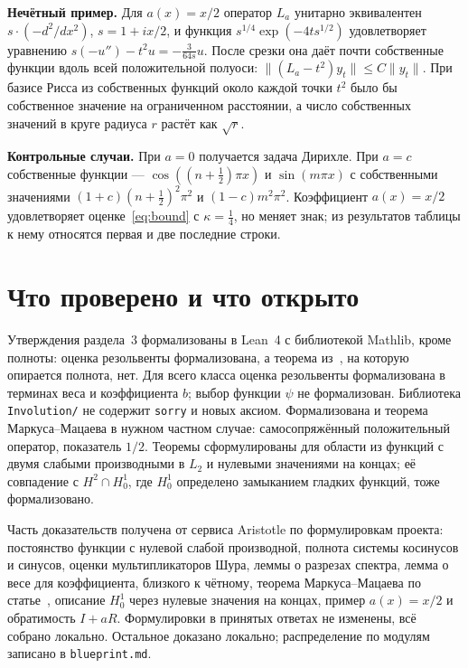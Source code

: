 \documentclass[12pt,a4paper]{article}
\begin{document}
\textbf{Нечётный пример.} Для $a(x)=x/2$ оператор $L_a$ унитарно эквивалентен
$s\cdot(-d^2/dx^2)$, $s=1+ix/2$, и функция $s^{1/4}\exp(-4ts^{1/2})$ удовлетворяет
уравнению $s(-u'')-t^2u=-\tfrac3{64s}u$. После срезки она даёт почти собственные функции
вдоль всей положительной полуоси: $\|(L_a-t^2)y_t\|\le C\|y_t\|$. При базисе Рисса из
собственных функций около каждой точки $t^2$ было бы собственное значение на ограниченном
расстоянии, а число собственных значений в круге радиуса $r$ растёт как $\sqrt r$.

\textbf{Контрольные случаи.} При $a=0$ получается задача Дирихле. При $a=c$ собственные
функции --- $\cos((n+\tfrac12)\pi x)$ и $\sin(m\pi x)$ с собственными значениями
$(1+c)(n+\tfrac12)^2\pi^2$ и $(1-c)m^2\pi^2$. Коэффициент $a(x)=x/2$ удовлетворяет
оценке~\eqref{eq:bound} с $\kappa=\tfrac14$, но меняет знак; из результатов таблицы к
нему относятся первая и две последние строки.

\section{Что проверено и что открыто}
Утверждения раздела~3 формализованы в Lean~4 с библиотекой Mathlib, кроме полноты:
оценка резольвенты формализована, а теорема из~\cite{S3}, на которую опирается полнота,
нет. Для всего класса оценка резольвенты формализована в терминах веса и коэффициента
$b$; выбор функции $\psi$ не формализован. Библиотека
\texttt{Involution/} не содержит \texttt{sorry} и новых аксиом. Формализована и теорема
Маркуса--Мацаева в нужном частном случае: самосопряжённый положительный оператор,
показатель $1/2$. Теоремы сформулированы для области из функций с двумя слабыми
производными в $L_2$ и нулевыми значениями на концах; её совпадение с
$H^2\cap H_0^1$, где $H_0^1$ определено замыканием гладких функций, тоже формализовано.

Часть доказательств получена от сервиса Aristotle по формулировкам проекта: постоянство
функции с нулевой слабой производной, полнота системы косинусов и синусов, оценки
мультипликаторов Шура, леммы о разрезах спектра, лемма о весе для коэффициента, близкого
к чётному, теорема Маркуса--Мацаева по статье~\cite{S4}, описание $H_0^1$ через
нулевые значения на концах, пример $a(x)=x/2$ и обратимость $I+aR$. Формулировки в
принятых ответах не изменены, всё собрано локально. Остальное доказано локально; распределение по модулям
записано в \texttt{blueprint.md}.
\end{document}
